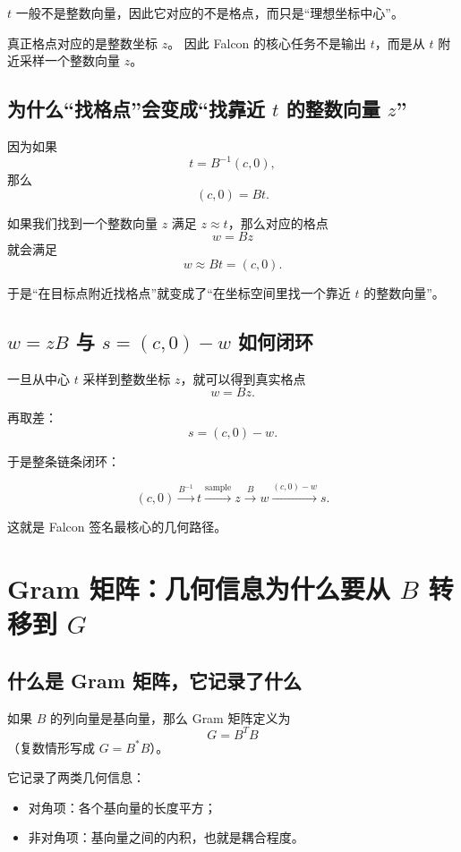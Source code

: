 \documentclass[11pt,a4paper]{ctexart}
\begin{document}
\(t\) 一般不是整数向量，因此它对应的不是格点，而只是“理想坐标中心”。

真正格点对应的是整数坐标 \(z\)。  
因此 Falcon 的核心任务不是输出 \(t\)，而是从 \(t\) 附近采样一个整数向量 \(z\)。

\subsection{为什么“找格点”会变成“找靠近 \(t\) 的整数向量 \(z\)”}

因为如果
\[
t=B^{-1}(c,0),
\]
那么
\[
(c,0)=Bt.
\]

如果我们找到一个整数向量 \(z\) 满足 \(z\approx t\)，那么对应的格点
\[
w=Bz
\]
就会满足
\[
w\approx Bt=(c,0).
\]

于是“在目标点附近找格点”就变成了“在坐标空间里找一个靠近 \(t\) 的整数向量”。

\subsection{\(w=zB\) 与 \(s=(c,0)-w\) 如何闭环}

一旦从中心 \(t\) 采样到整数坐标 \(z\)，就可以得到真实格点
\[
w=Bz.
\]

再取差：
\[
s=(c,0)-w.
\]

于是整条链条闭环：

\[
(c,0)\xrightarrow{B^{-1}} t \xrightarrow{\text{sample}} z \xrightarrow{B} w \xrightarrow{(c,0)-w} s.
\]

这就是 Falcon 签名最核心的几何路径。

\section{Gram 矩阵：几何信息为什么要从 \(B\) 转移到 \(G\)}

\subsection{什么是 Gram 矩阵，它记录了什么}

如果 \(B\) 的列向量是基向量，那么 Gram 矩阵定义为
\[
G=B^T B
\]
（复数情形写成 \(G=B^*B\)）。

它记录了两类几何信息：

\begin{itemize}
    \item 对角项：各个基向量的长度平方；
    \item 非对角项：基向量之间的内积，也就是耦合程度。
\end{itemize}
\end{document}
